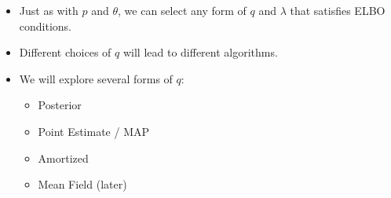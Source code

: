 







\begin{frame}
\begin{itemize}
    
    \item Just as with $p$ and $\theta$, we can select any form of $q$ and $\lambda$ that satisfies ELBO conditions. 
    \item Different choices of $q$ will lead to different algorithms.
    \item We will explore several forms of $q$: 
    \begin{itemize}
        \item Posterior
        \item Point Estimate / MAP
        \item Amortized
        \item Mean Field (later)
    \end{itemize}
\end{itemize}
\end{frame}

